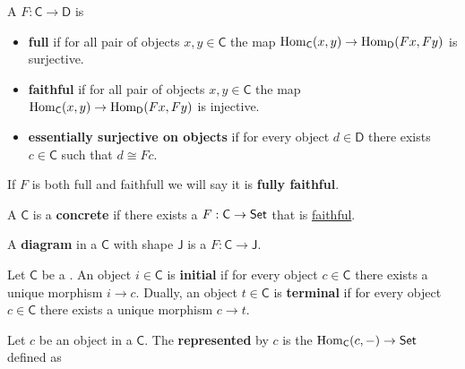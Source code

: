 \documentclass[../main.tex]{subfiles}
\begin{document}
\begin{definition} \label{def:functor-types}
  A  \(F: \mathsf{C} \to \mathsf{D}\) is
  \begin{itemize}
    \item \textbf{full} if for all pair of objects \(x, y \in \mathsf{C}\) the map \(\operatorname{Hom}_{\mathsf{C}}(x, y) \to \operatorname{Hom}_{\mathsf{D}}(Fx, Fy)\) is surjective.
    \item \textbf{faithful} if for all pair of objects \(x, y \in \mathsf{C}\) the map \(\operatorname{Hom}_{\mathsf{C}}(x, y) \to \operatorname{Hom}_{\mathsf{D}}(Fx, Fy)\) is injective.
    \item \textbf{essentially surjective on objects} if for every object \(d \in \mathsf{D}\) there exists \(c \in \mathsf{C}\) such that \(d \cong Fc\).
  \end{itemize}

  If \(F\) is both full and faithfull we will say it is \textbf{fully faithful}.
\end{definition}

\begin{definition} \label{def:concrete-category}
  A  \(\mathsf{C}\) is a \textbf{concrete } if there exists a  \(F: \mathsf{C} \to \mathsf{Set}\) that is \hyperref[def:functor-types]{faithful}.
\end{definition}


\begin{definition}[Diagram] \label{def:diagram}
  A \textbf{diagram} in a  \(\mathsf{C}\) with shape \(\mathsf{J}\) is a  \(F: \mathsf{C} \to \mathsf{J}\).
\end{definition}

\begin{definition} \label{def:initial-terminal-objects}
  Let \(\mathsf{C}\) be a .
  An object \(i \in \mathsf{C}\) is \textbf{initial} if for every object \(c \in \mathsf{C}\) there exists a unique morphism \(i \to c\).
  Dually, an object \(t \in \mathsf{C}\) is \textbf{terminal} if for every object \(c \in \mathsf{C}\) there exists a unique morphism \(c \to t\).
\end{definition}

\begin{definition} \label{def:functors-represented-by}
  Let \(c\) be an object in a  \(\mathsf{C}\).
  The \textbf{ represented} by \(c\) is the  \(\operatorname{Hom}_{\mathsf{C}}(c, -) \to \mathsf{Set}\) defined as
  \begin{center}
  \end{center}
\end{definition}
\end{document}
